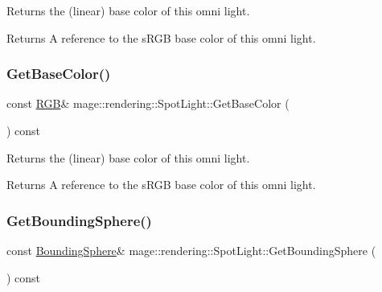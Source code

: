 Returns the (linear) base color of this omni light.

\begin{DoxyReturn}{Returns}
A reference to the s\+R\+GB base color of this omni light. 
\end{DoxyReturn}
\hypertarget{classmage_1_1rendering_1_1_spot_light_a66cf454577d92d091f6505f3ff52148f}{}\label{classmage_1_1rendering_1_1_spot_light_a66cf454577d92d091f6505f3ff52148f} 
\subsubsection{\texorpdfstring{Get\+Base\+Color()}{GetBaseColor()}\hspace{0.1cm}{\footnotesize\ttfamily [2/2]}}
{\footnotesize\ttfamily const \hyperlink{structmage_1_1_r_g_b}{R\+GB}\& mage\+::rendering\+::\+Spot\+Light\+::\+Get\+Base\+Color (\begin{DoxyParamCaption}{ }\end{DoxyParamCaption}) const\hspace{0.3cm}{\ttfamily [noexcept]}}

Returns the (linear) base color of this omni light.

\begin{DoxyReturn}{Returns}
A reference to the s\+R\+GB base color of this omni light. 
\end{DoxyReturn}
\hypertarget{classmage_1_1rendering_1_1_spot_light_a003e42ab1d3059ae5750893bcaa8e0b3}{}\label{classmage_1_1rendering_1_1_spot_light_a003e42ab1d3059ae5750893bcaa8e0b3} 
\subsubsection{\texorpdfstring{Get\+Bounding\+Sphere()}{GetBoundingSphere()}}
{\footnotesize\ttfamily const \hyperlink{classmage_1_1_bounding_sphere}{Bounding\+Sphere}\& mage\+::rendering\+::\+Spot\+Light\+::\+Get\+Bounding\+Sphere (\begin{DoxyParamCaption}{ }\end{DoxyParamCaption}) const\hspace{0.3cm}{\ttfamily [noexcept]}}

